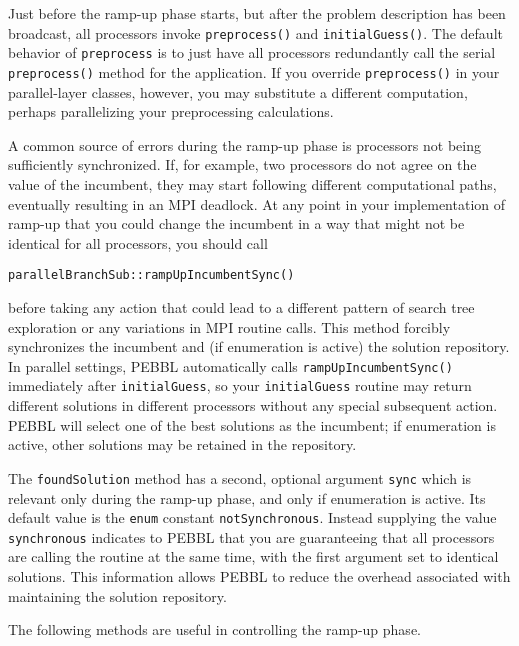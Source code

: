 Just before the ramp-up phase starts, but after the problem
description has been broadcast, all processors invoke
\texttt{preprocess()} and \texttt{initialGuess()}.  The default behavior
of \texttt{preprocess} is to just have all processors redundantly call
the serial \texttt{preprocess()} method for the application.  If you
override \texttt{preprocess()} in your parallel-layer classes, however,
you may substitute a different computation, perhaps parallelizing your
preprocessing calculations.

A common source of errors during the ramp-up phase is processors 
not being sufficiently synchronized.  If, for example, two processors do
not agree on the value of the incumbent, they may start following
different computational paths, eventually resulting in an MPI
deadlock.  At any point in your implementation of ramp-up that you
could change the incumbent in a way that might not be identical for
all processors, you should call
\begin{codeblock}
\texttt{parallelBranchSub::rampUpIncumbentSync()}
\end{codeblock}
before taking any action that could lead to a different pattern of
search tree exploration or any variations in MPI routine calls.
This method forcibly synchronizes the incumbent and (if enumeration is
active) the solution repository.  In parallel settings, PEBBL
automatically calls \texttt{rampUpIncumbentSync()} immediately after
\texttt{initialGuess}, so your \texttt{initialGuess} routine may
return different solutions in different processors without any special
subsequent action.  PEBBL will select one of the best solutions
as the incumbent; if enumeration is active, other solutions may be
retained in the repository.

The \texttt{foundSolution} method has a second, optional argument
\texttt{sync} which is relevant only during the ramp-up phase, and
only if enumeration is active.  Its
default value is the \texttt{enum} constant \texttt{notSynchronous}.
Instead supplying the value \texttt{synchronous} indicates to PEBBL
that you are guaranteeing that all processors are calling the routine
at the same time, with the first argument set to identical solutions.
This information allows PEBBL to reduce the overhead associated with
maintaining the solution repository.

The following methods are useful in controlling the ramp-up phase.


